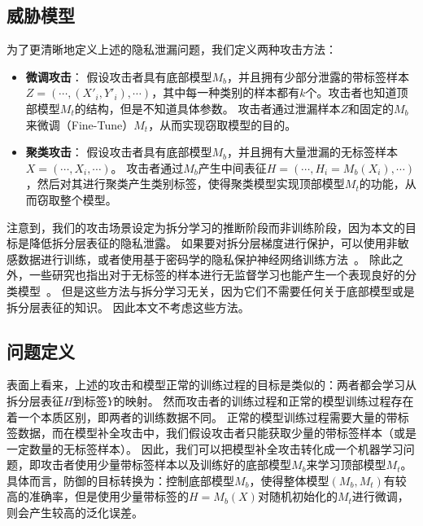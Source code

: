 \subsection{威胁模型}
为了更清晰地定义上述的隐私泄漏问题，我们定义两种攻击方法：
\begin{itemize}
    \item \textbf{微调攻击}：
    假设攻击者具有底部模型$M_b$，并且拥有少部分泄露的带标签样本$Z = (\cdots, (X'_i, Y'_i), \cdots)$，其中每一种类别的样本都有$k$个。攻击者也知道顶部模型$M_t$的结构，但是不知道具体参数。
    攻击者通过泄漏样本$Z$和固定的$M_b$来微调（Fine-Tune）$M_t$，从而实现窃取模型的目的。

    \item \textbf{聚类攻击}：
    假设攻击者具有底部模型$M_b$，并且拥有大量泄漏的无标签样本$X = (\cdots, X_i, \cdots)$。
    攻击者通过$M_b$产生中间表征$H = (\cdots, H_i = M_b(X_i), \cdots)$，然后对其进行聚类产生类别标签，使得聚类模型实现顶部模型$M_t$的功能，从而窃取整个模型。
\end{itemize}

注意到，我们的攻击场景设定为拆分学习的推断阶段而非训练阶段，因为本文的目标是降低拆分层表征的隐私泄露。
%
如果要对拆分层梯度进行保护，可以使用非敏感数据进行训练，或者使用基于密码学的隐私保护神经网络训练方法~\cite{mohassel2017secureml,wagh2019securenn}。
%
除此之外，一些研究也指出对于无标签的样本进行无监督学习也能产生一个表现良好的分类模型~\cite{berthelot2019mixmatch,xuyi2021dp_ssl}。
但是这些方法与拆分学习无关，因为它们不需要任何关于底部模型或是拆分层表征的知识。
因此本文不考虑这些方法。
%

\subsection{问题定义}
表面上看来，上述的攻击和模型正常的训练过程的目标是类似的：两者都会学习从拆分层表征$H$到标签$Y$的映射。
%
然而攻击者的训练过程和正常的模型训练过程存在着一个本质区别，即两者的训练数据不同。
正常的模型训练过程需要大量的带标签数据，而在模型补全攻击中，我们假设攻击者只能获取少量的带标签样本（或是一定数量的无标签样本）。
%
因此，我们可以把模型补全攻击转化成一个机器学习问题，即攻击者使用少量带标签样本以及训练好的底部模型$M_b$来学习顶部模型$M_t$。
具体而言，防御的目标转换为：控制底部模型$M_b$，使得整体模型$(M_b, M_t)$有较高的准确率，但是使用少量带标签的$H = M_b(X)$对随机初始化的$M_t$进行微调，则会产生较高的泛化误差。
%

